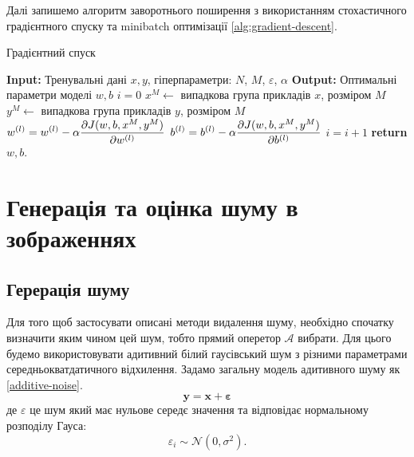 \documentclass[14pt,a4paper]{extarticle}
\renewcommand{\algorithmicrequire}{\textbf{Input: }}
\renewcommand{\algorithmicensure}{\textbf{Output: }}
\newcommand{\algorithmreturn}{\textbf{return }}
\newcounter{e}
\numberwithin{equation}{section}
\numberwithin{figure}{section}
\begin{document}
	Далі запишемо алгоритм заворотнього поширення з використанням стохастичного градієнтного спуску та minibatch оптимізації \ref{alg:gradient-descent}.
	\begin{algorithm}[H]
		\caption{Градієнтний спуск}
		\label{alg:gradient-descent}
		\begin{algorithmic}[1]
			\State \algorithmicrequire{Тренувальні дані $x, y$, гіперпараметри: $N$, $M$, $\varepsilon$, $\alpha$}
			\State \algorithmicensure{ Оптимальні параметри моделі $w, b$}
			\State $i = 0$
			\State $x^M \leftarrow$ випадкова група прикладів $x$, розміром $M$
			\State $y^M \leftarrow$ випадкова група прикладів $y$, розміром $M$
			\State $\displaystyle w^{(l)} = w^{(l)} -  \alpha \pdv{J(w, b, x^M, y^M)}{w^{(l)}}$
			\vspace{0.2cm}
			\State $\displaystyle b^{(l)} = b^{(l)} - \alpha \pdv{J(w, b, x^M, y^M)}{b^{(l)}}$
			\State $\displaystyle i = i + 1$
			\EndFor
			\EndWhile
			\State \algorithmreturn{$w, b$}.
		\end{algorithmic}
	\end{algorithm}

	\newpage
	\thispagestyle{empty}
	\section{Генерація та оцінка шуму в зображеннях}

	\subsection{Герерація шуму}	
	Для того щоб застосувати описані методи видалення шуму, необхідно спочатку визначити яким чином цей шум, тобто прямий оперетор $\mathcal{A}$ вибрати. Для цього будемо використовувати адитивний білий гаусівський шум з різними параметрами середньокватдатичного відхилення. Задамо загальну модель адитивного шуму як \ref{additive-noise}.
	\begin{equation}
		\label{additive-noise}
		\mathbf{y}=\mathbf{x} + \mathbf{\varepsilon}
	\end{equation}
	де $\varepsilon$ це шум який має нульове середє значення та відповідає нормальному розподілу Гауса:
	\begin{equation}
		\varepsilon_{i} \sim \mathcal{N}\left(0, \sigma^{2}\right) .
	\end{equation}
	
\end{document}
